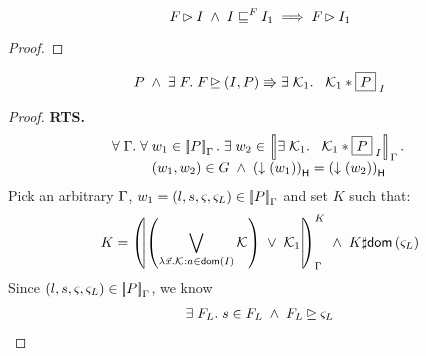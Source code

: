 %
%
\begin{lemma}[]
%
\[
		\fence{} \fences I \;\land\; I \weakenI{\fence{}} I_1 \implies \fence{} \fences I_1
\]
%
\begin{proof}
\todo
\end{proof}
\end{lemma}
%
%

\begin{lemma}[] \label{lem:extension}
%
\[
		P \;\land\; \exsts{\fence{}} \fence{} \strictfences (I, P)  \Rrightarrow \exsts{\capAss{1}} \;\; \capAss{1} * \shared{P}{I}
\]
%
\begin{proof}
\textbf{RTS. }
%
\[
\begin{array}{l}
	\for{\lenv} \for{w_1 \in \sem[\lenv]{P}} \exsts{w_2 \in \sem[\lenv]{\exsts{\capAss{1}} \;\; \capAss{1} * \shared{P }{I}}}\\
	\hspace*{1cm} (w_1, w_2) \in \guarantee \;\land\; \heapPart{\left(\collapseW{w_1}\right)} = \heapPart{\left(\collapseW{w_2}\right)}
\end{array}
\]
%
Pick an arbitrary $\lenv$, $w_1 = (l, s, \amod{}, \amod{L}) \in \sem[\lenv]{P}$ and set $K$ such that:
\begin{align}
	K = 
	\semK[\lenv]{\left( \bigvee\limits_{\lambda \vec{x}. \capAss{}: a \in \dom{I}} \capAss{}\right) \;\lor\; \capAss{1} }
	\;\land\; K \disjoint \dom{\amod{L}} \label{LE:Ass1}
\end{align}	 
%
Since $(l, s, \amod{}, \amod{L}) \in \sem[\lenv]{P}$, we know 
\begin{align}
	\exsts{\fence{L}} s \in \fence{L} \;\land\; \fence{L} \strictfences \amod{L} \label{LE:Ass2}
\end{align} 

\end{proof}
\end{lemma}
